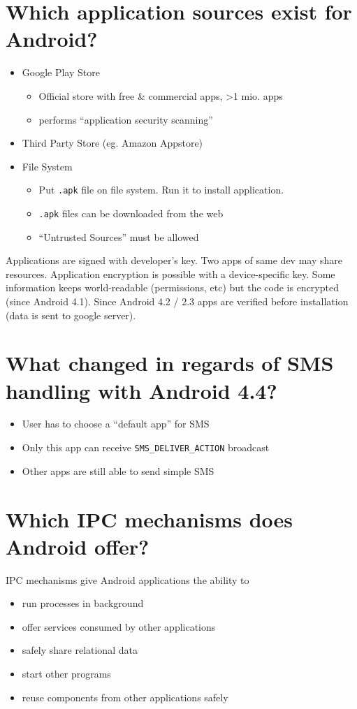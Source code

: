 \documentclass[twocolumn]{article}
\newcommand{\question}[1]{\section{#1}}
\begin{document}
\question{Which application sources exist for Android?}
%
\begin{itemize}
  \item Google Play Store
    \begin{itemize}
      \item Official store with free \& commercial apps, >1 mio. apps
      \item performs ``application security scanning''
    \end{itemize}
  \item Third Party Store (eg. Amazon Appstore)
  \item File System
    \begin{itemize}
      \item Put \texttt{.apk} file on file system. Run it to install application.
      \item \texttt{.apk} files can be downloaded from the web
      \item ``Untrusted Sources'' must be allowed
    \end{itemize}
\end{itemize}

Applications are signed with developer's key. Two apps of same dev may share resources.
Application encryption is possible with a device-specific key. Some information keeps world-readable (permissions, etc) but the code is encrypted (since Android 4.1). Since Android 4.2 / 2.3 apps are verified before installation (data is sent to google server).

\question{What changed in regards of SMS handling with Android 4.4?}
%
\begin{itemize}
  \item User has to choose a ``default app'' for SMS
  \item Only this app can receive \texttt{SMS\_DELIVER\_ACTION} broadcast
  \item Other apps are still able to send simple SMS
\end{itemize}

\question{Which IPC mechanisms does Android offer?}
%
IPC mechanisms give Android applications the ability to
\begin{itemize}
  \item run processes in background
  \item offer services consumed by other applications
  \item safely share relational data
  \item start other programs
  \item reuse components from other applications safely
\end{itemize}
\end{document}
